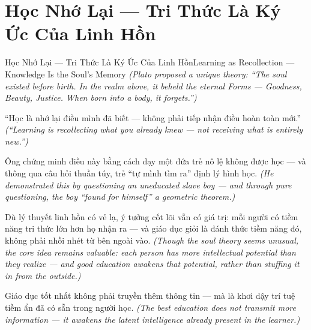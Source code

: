 \section{Học Nhớ Lại — Tri Thức Là Ký Ức Của Linh Hồn}
\begin{truyen}{Học Nhớ Lại — Tri Thức Là Ký Ức Của Linh Hồn}{Learning as Recollection — Knowledge Is the Soul's Memory}
\textit{(Plato proposed a unique theory: ``The soul existed before birth. In the realm above, it beheld the eternal Forms — Goodness, Beauty, Justice. When born into a body, it forgets.'')}

``Học là nhớ lại điều mình đã biết — không phải tiếp nhận điều hoàn toàn mới.''
\textit{(``Learning is recollecting what you already knew — not receiving what is entirely new.'')}

Ông chứng minh điều này bằng cách dạy một đứa trẻ nô lệ không được học — và thông qua câu hỏi thuần túy, trẻ ``tự mình tìm ra'' định lý hình học.
\textit{(He demonstrated this by questioning an uneducated slave boy — and through pure questioning, the boy ``found for himself'' a geometric theorem.)}

Dù lý thuyết linh hồn có vẻ lạ, ý tưởng cốt lõi vẫn có giá trị: mỗi người có tiềm năng tri thức lớn hơn họ nhận ra — và giáo dục giỏi là đánh thức tiềm năng đó, không phải nhồi nhét từ bên ngoài vào.
\textit{(Though the soul theory seems unusual, the core idea remains valuable: each person has more intellectual potential than they realize — and good education awakens that potential, rather than stuffing it in from the outside.)}

\end{truyen}

\begin{baihoc}
Giáo dục tốt nhất không phải truyền thêm thông tin — mà là khơi dậy trí tuệ tiềm ẩn đã có sẵn trong người học.
\textit{(The best education does not transmit more information — it awakens the latent intelligence already present in the learner.)}
\end{baihoc}
\ngancach

